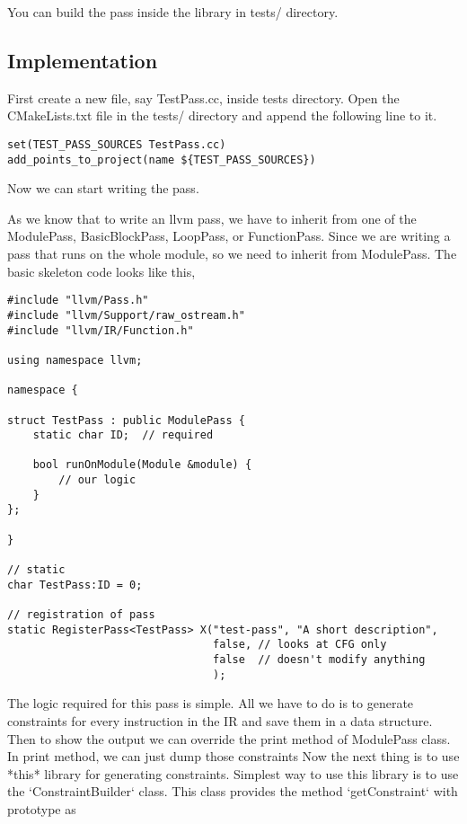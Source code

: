 You can build the pass inside the library in tests/ directory.

\subsection{Implementation}
First create a new file, say TestPass.cc, inside tests directory. Open the CMakeLists.txt file in the tests/ directory and append the following line to it.

\begin{lstlisting}
set(TEST_PASS_SOURCES TestPass.cc)
add_points_to_project(name ${TEST_PASS_SOURCES})
\end{lstlisting}

Now we can start writing the pass.

As we know that to write an llvm pass, we have to inherit from one of the ModulePass, BasicBlockPass, LoopPass, or FunctionPass. Since we are writing a pass that runs on the whole module, so we need to inherit from ModulePass.
The basic skeleton code looks like this,


\begin{lstlisting}
#include "llvm/Pass.h"
#include "llvm/Support/raw_ostream.h"
#include "llvm/IR/Function.h"

using namespace llvm;

namespace {

struct TestPass : public ModulePass {
    static char ID;  // required

    bool runOnModule(Module &module) {
        // our logic
    }
};

}

// static
char TestPass:ID = 0;

// registration of pass
static RegisterPass<TestPass> X("test-pass", "A short description",
                                false, // looks at CFG only
                                false  // doesn't modify anything
                                );
\end{lstlisting}

The logic required for this pass is simple. All we have to do is to generate
constraints for every instruction in the IR and save them in a data structure.
Then to show the output we can override the print method of ModulePass class.
In print method, we can just dump those constraints\newline
Now the next thing is to use *this* library for generating constraints.
Simplest way to use this library is to use the `ConstraintBuilder` class. This
class provides the method `getConstraint` with prototype as

